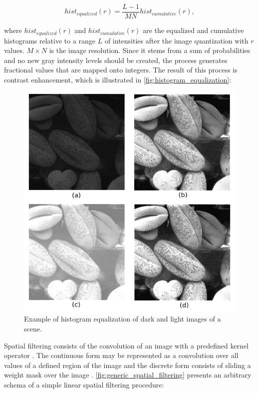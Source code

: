 \begin{equation}
\label{eqn:histogram_equalization}
hist_{equalized}(r) = \frac{L - 1}{MN} hist_{cumulative}(r),
\end{equation}

\noindent where $hist_{equalized}(r)$ and $hist_{cumulative}(r)$ are the equalized and cumulative histograms relative to a range $L$ of intensities after the image quantization with $r$ values. $M \times N$ is the image resolution. Since it stems from a sum of probabilities and no new gray intensity levels should be created, the process generates fractional values that are mapped onto integers. The result of this process is contrast enhancement, which is illustrated in \autoref{fig:histogram_equalization}:

\begin{figure}[htb]
	\centering
	\caption{\label{fig:histogram_equalization} Example of histogram equalization of dark and light images of a scene.} 
	\begin{center}
	    \includegraphics[scale=0.5]{images/histogram_equalization.png}
	\end{center}
	\centering
\end{figure}


Spatial filtering consists of the convolution of an image with a predefined kernel operator \cite{gonzalez2018digital}. The continuous form may be represented as a convolution over all values of a defined region of the image and the discrete form consists of sliding a weight mask over the image \cite{wu2008microscope}. \autoref{fig:generic_spatial_filtering} presents an arbitrary schema of a simple linear spatial filtering procedure:

